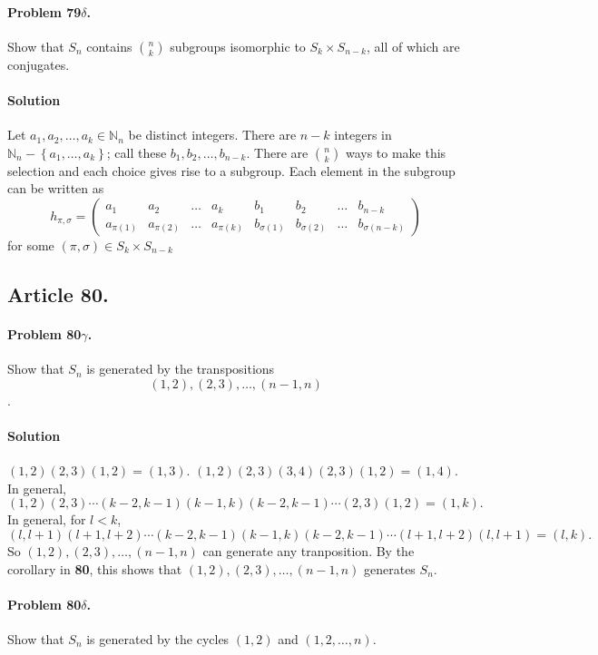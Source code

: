 \paragraph{Problem 79$\delta$.}
Show that $S_n$ contains $\binom{n}{k}$
subgroups isomorphic to $S_k \times S_{n-k}$, all of which are conjugates.

\paragraph*{Solution}
Let $a_1, a_2, \dots , a_k \in \mathbb{N}_n$ be distinct integers. There are
$n-k$ integers in $\mathbb{N}_n - \left\{a_1, \dots , a_k\right\}$; call these
$b_1, b_2, \dots , b_{n-k}$. There are $\binom{n}{k}$ ways to make this selection
and each choice gives rise to a subgroup. Each element in the subgroup can be
written as
$$
h_{\pi, \sigma} =
\left(
\begin{array}{cccccccc}
a_1        & a_2        & \dots & a_k        & b_1           & b_2           & \dots & b_{n-k} \\
a_{\pi(1)} & a_{\pi(2)} & \dots & a_{\pi(k)} & b_{\sigma(1)} & b_{\sigma(2)} & \dots & b_{\sigma(n-k)}
\end{array}
\right)
$$
for some $(\pi, \sigma) \in S_k \times S_{n-k}$

\subsection{Article 80.}

\paragraph{Problem 80$\gamma$.}
Show that $S_n$ is generated by the transpositions $$(1,2), (2,3), \dots, (n-1,n)$$.

\paragraph*{Solution}
$(1,2)(2,3)(1,2) = (1,3)$.
$(1,2)(2,3)(3,4)(2,3)(1,2) = (1,4)$.
In general, $$(1,2)(2,3) \cdots (k-2,k-1)(k-1,k)(k-2,k-1) \cdots (2,3)(1,2) = (1,k).$$
In general, for $l < k$,
$$(l,l+1)(l+1,l+2) \cdots (k-2,k-1)(k-1,k)(k-2,k-1) \cdots (l+1,l+2)(l,l+1) = (l,k).$$
So $(1,2), (2,3), \dots, (n-1,n)$ can generate any tranposition. By the corollary
in \textbf{80}, this shows that $(1,2), (2,3), \dots, (n-1,n)$ generates $S_n$.

\paragraph{Problem 80$\delta$.}
Show that $S_n$ is generated by the cycles $(1,2)$ and $(1,2, \dots, n)$.

